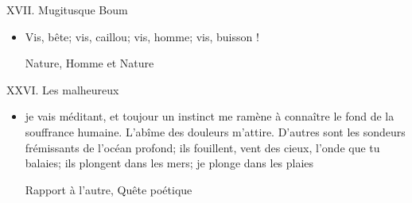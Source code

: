 \documentclass[french,a4paper,11pt,answers]{exam}
\newcommand{\cit}[2]{\og #1 \fg{} \begin{solution}{ #2 }\end{solution}} %
\begin{document}
	\begin{cadre}{XVII. Mugitusque Boum}
		\begin{itemize}
			\item \cit{Vis, bête; vis, caillou; vis, homme; vis, buisson !}{Nature, Homme et Nature}
		\end{itemize}
	\end{cadre}
	
	\begin{cadre}{XXVI. Les malheureux}
		\begin{itemize}
			\item \cit{je vais méditant, et toujour un instinct me ramène à connaître le fond de la souffrance humaine. L'abîme des douleurs m'attire. D'autres sont les sondeurs frémissants de l'océan profond; ils fouillent, vent des cieux, l'onde que tu balaies; ils plongent dans les mers; je plonge dans les plaies}{Rapport à l'autre, Quête poétique}
		\end{itemize}
	\end{cadre}
	
\end{document}
